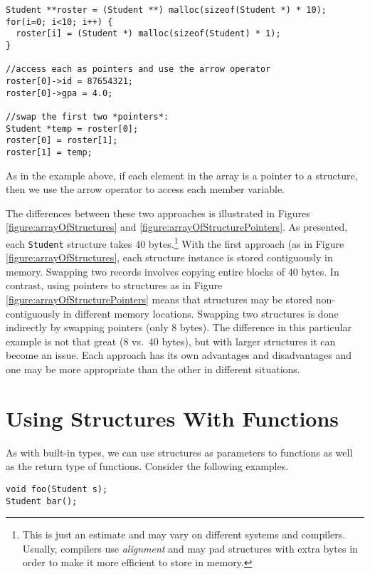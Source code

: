 \begin{verbatim}
Student **roster = (Student **) malloc(sizeof(Student *) * 10);
for(i=0; i<10; i++) {
  roster[i] = (Student *) malloc(sizeof(Student) * 1);
}

//access each as pointers and use the arrow operator
roster[0]->id = 87654321;
roster[0]->gpa = 4.0;

//swap the first two *pointers*:
Student *temp = roster[0];
roster[0] = roster[1];
roster[1] = temp;
\end{verbatim}

As in the example above, if each element in the array is a pointer
to a structure, then we use the arrow operator to access each 
member variable.

The differences between these two approaches is illustrated in
Figures \ref{figure:arrayOfStructures} and \ref{figure:arrayOfStructurePointers}.
As presented, each \texttt{Student} structure takes 40 
bytes.\footnote{This is just an estimate and may vary on different systems
and compilers.  Usually, compilers use \emph{alignment} and may pad
structures with extra bytes in order to make it more efficient to store
in memory.}  With the first approach (as in Figure 
\ref{figure:arrayOfStructures}, each structure instance is stored 
contiguously in memory.  Swapping two records involves copying entire
blocks of 40 bytes.  In contrast, using pointers to structures as in
Figure \ref{figure:arrayOfStructurePointers} means that structures may
be stored non-contiguously in different memory locations.  Swapping
two structures is done indirectly by swapping pointers (only 8 bytes).
The difference in this particular example is not that great (8 vs.\ 40 bytes), 
but with larger structures it can become an issue.  Each approach has
its own advantages and disadvantages and one may be more appropriate 
than the other in different situations.





\section{Using Structures With Functions}

As with built-in types, we can use structures as parameters to functions
as well as the return type of functions.  Consider the following
examples.

\begin{verbatim}
void foo(Student s);
Student bar();
\end{verbatim}

